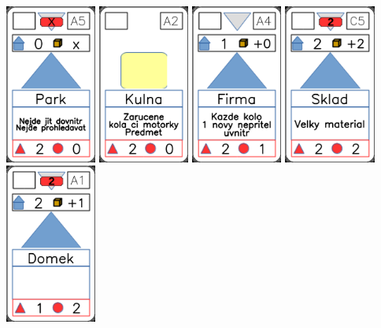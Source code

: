 \documentclass[a4paper]{article}
\begin{document}
	\includegraphics[width=3.0cm]{img-3_19}
	\includegraphics[width=3.0cm]{img-2_16}
	\includegraphics[width=3.0cm]{img-3_18}
	\includegraphics[width=3.0cm]{img-3_14}
	\includegraphics[width=3.0cm]{img-3_0}
\end{document}
